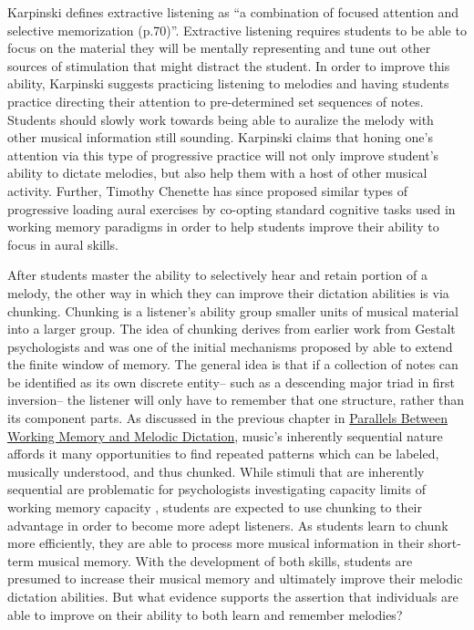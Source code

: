 \documentclass[]{book}
\begin{document}
Karpinski defines extractive listening as ``a combination of focused attention and selective memorization (p.70)''.
Extractive listening requires students to be able to focus on the material they will be mentally representing and tune out other sources of stimulation that might distract the student.
In order to improve this ability, Karpinski suggests practicing listening to melodies and having students practice directing their attention to pre-determined set sequences of notes.
Students should slowly work towards being able to auralize the melody with other musical information still sounding.
Karpinski claims that honing one's attention via this type of progressive practice will not only improve student's ability to dictate melodies, but also help them with a host of other musical activity.
Further, Timothy Chenette has since proposed similar types of progressive loading aural exercises by co-opting standard cognitive tasks used in working memory paradigms \citep{chenetteReframingAuralSkills2019} in order to help students improve their ability to focus in aural skills.

After students master the ability to selectively hear and retain portion of a melody, the other way in which they can improve their dictation abilities is via chunking.
Chunking is a listener's ability group smaller units of musical material into a larger group.
The idea of chunking derives from earlier work from Gestalt psychologists and was one of the initial mechanisms proposed by \citet{millerMagicalNumberSeven1956} able to extend the finite window of memory.
The general idea is that if a collection of notes can be identified as its own discrete entity-- such as a descending major triad in first inversion-- the listener will only have to remember that one structure, rather than its component parts.
As discussed in the previous chapter in \protect\hyperlink{parallels-between-working-memory-and-melodic-dictation}{Parallels Between Working Memory and Melodic Dictation}, music's inherently sequential nature affords it many opportunities to find repeated patterns which can be labeled, musically understood, and thus chunked.
While stimuli that are inherently sequential are problematic for psychologists investigating capacity limits of working memory capacity \citep{cowanWorkingMemoryCapacity2005}, students are expected to use chunking to their advantage in order to become more adept listeners.
As students learn to chunk more efficiently, they are able to process more musical information in their short-term musical memory.
With the development of both skills, students are presumed to increase their musical memory and ultimately improve their melodic dictation abilities.
But what evidence supports the assertion that individuals are able to improve on their ability to both learn and remember melodies?
\end{document}
